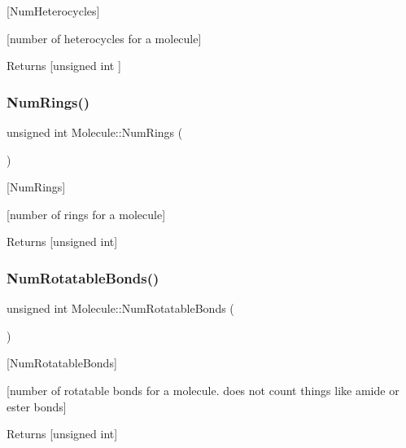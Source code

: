 \mbox{[}Num\+Heterocycles\mbox{]} 

\mbox{[}number of heterocycles for a molecule\mbox{]}

\begin{DoxyReturn}{Returns}
\mbox{[}unsigned int \mbox{]} 
\end{DoxyReturn}
\mbox{\label{class_molecule_a0a3b03a9c5fcc9d24f2f285fdb68361a}} 
\subsubsection{\texorpdfstring{Num\+Rings()}{NumRings()}}
{\footnotesize\ttfamily unsigned int Molecule\+::\+Num\+Rings (\begin{DoxyParamCaption}{ }\end{DoxyParamCaption})}



\mbox{[}Num\+Rings\mbox{]} 

\mbox{[}number of rings for a molecule\mbox{]}

\begin{DoxyReturn}{Returns}
\mbox{[}unsigned int\mbox{]} 
\end{DoxyReturn}
\mbox{\label{class_molecule_a1185b821c895d5bfd39d194570749524}} 
\subsubsection{\texorpdfstring{Num\+Rotatable\+Bonds()}{NumRotatableBonds()}}
{\footnotesize\ttfamily unsigned int Molecule\+::\+Num\+Rotatable\+Bonds (\begin{DoxyParamCaption}{ }\end{DoxyParamCaption})}



\mbox{[}Num\+Rotatable\+Bonds\mbox{]} 

\mbox{[}number of rotatable bonds for a molecule. does not count things like amide or ester bonds\mbox{]}

\begin{DoxyReturn}{Returns}
\mbox{[}unsigned int\mbox{]} 
\end{DoxyReturn}
\mbox{\label{class_molecule_a63f6f6403e648006f25feb9103add3ce}} 
